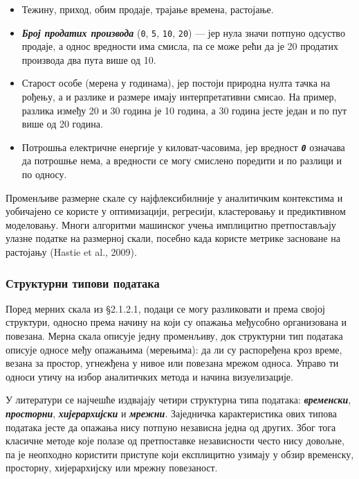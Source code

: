 \begin{itemize}
  \item Тежину, приход, обим продаје, трајање времена, растојање.
  \item \textbf{\textit{Број продатих производа}} (\texttt{0}, \texttt{5}, \texttt{10}, \texttt{20}) — јер нула значи потпуно одсуство продаје, а однос вредности има смисла, па се може рећи да је 20 продатих производа два пута више од 10.
  \item Старост особе (мерена у годинама), јер постоји природна нулта тачка на рођењу, а и разлике и размере имају интерпретативни смисао. На пример, разлика између 20 и 30 година је 10 година, а 30 година јесте један и по пут више од 20 година.
  \item Потрошња електричне енергије у киловат-часовима, јер вредност \textbf{\textit{\texttt{0}}} означава да потрошње нема, а вредности се могу смислено поредити и по разлици и по односу.
\end{itemize}
Променљиве размерне скале су најфлексибилније у аналитичким контекстима и уобичајено се користе у оптимизацији, регресији, кластеровању и предиктивном моделовању. Многи алгоритми машинског учења имплицитно претпостављају улазне податке на размерној скали, посебно када користе метрике засноване на растојању (Hastie et al., 2009).

\subsubsection{Структурни типови података}
Поред мерних скала из §2.1.2.1, подаци се могу разликовати и према својој структури, односно према начину на који су опажања међусобно организована и повезана. Мерна скала описује једну променљиву, док структурни тип података описује односе међу опажањима (мерењима): да ли су распоређена кроз време, везана за простор, угнежђена у нивое или повезана мрежом односа. Управо ти односи утичу на избор аналитичких метода и начина визуелизације.

У литератури се најчешће издвајају четири структурна типа података: \textbf{\textit{временски}}, \textbf{\textit{просторни}}, \textbf{\textit{хијерархијски}} и \textbf{\textit{мрежни}}. Заједничка карактеристика ових типова података јесте да опажања нису потпуно независна једна од других. Због тога класичне методе које полазе од претпоставке независности често нису довољне, па је неопходно користити приступе који експлицитно узимају у обзир временску, просторну, хијерархијску или мрежну повезаност.

